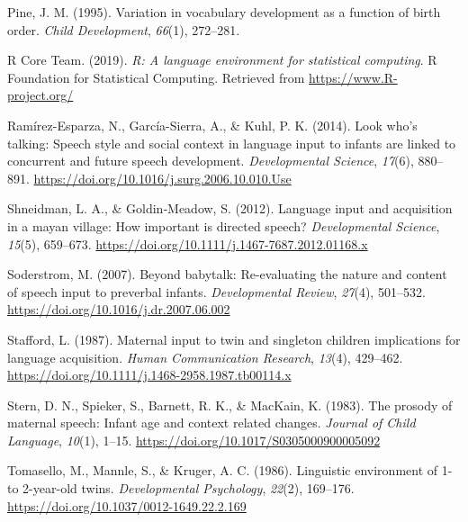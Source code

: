 \documentclass[
  english,
  man,floatsintext]{apa6}
\newlength{\cslhangindent}
\newlength{\cslentryspacingunit} %
\newenvironment{CSLReferences}[2] %
 {%
  \setlength{\parindent}{0pt}
  \ifodd #1
  \let\oldpar\par
  \def\par{\hangindent=\cslhangindent\oldpar}
  \fi
  \setlength{\parskip}{#2\cslentryspacingunit}
 }%
 {}
\begin{document}
\begin{CSLReferences}{1}{0}
\leavevmode{}%
Pine, J. M. (1995). Variation in vocabulary development as a function of birth order. \emph{Child Development}, \emph{66}(1), 272--281.

\leavevmode{}%
R Core Team. (2019). \emph{R: A language environment for statistical computing}. R Foundation for Statistical Computing. Retrieved from \url{https://www.R-project.org/}

\leavevmode{}%
Ramírez-Esparza, N., García-Sierra, A., \& Kuhl, P. K. (2014). Look who's talking: Speech style and social context in language input to infants are linked to concurrent and future speech development. \emph{Developmental Science}, \emph{17}(6), 880--891. \url{https://doi.org/10.1016/j.surg.2006.10.010.Use}

\leavevmode{}%
Shneidman, L. A., \& Goldin‐Meadow, S. (2012). Language input and acquisition in a mayan village: How important is directed speech? \emph{Developmental Science}, \emph{15}(5), 659--673. \url{https://doi.org/10.1111/j.1467-7687.2012.01168.x}

\leavevmode{}%
Soderstrom, M. (2007). Beyond babytalk: Re-evaluating the nature and content of speech input to preverbal infants. \emph{Developmental Review}, \emph{27}(4), 501--532. \url{https://doi.org/10.1016/j.dr.2007.06.002}

\leavevmode{}%
Stafford, L. (1987). Maternal input to twin and singleton children implications for language acquisition. \emph{Human Communication Research}, \emph{13}(4), 429--462. \url{https://doi.org/10.1111/j.1468-2958.1987.tb00114.x}

\leavevmode{}%
Stern, D. N., Spieker, S., Barnett, R. K., \& MacKain, K. (1983). The prosody of maternal speech: Infant age and context related changes. \emph{Journal of Child Language}, \emph{10}(1), 1--15. \url{https://doi.org/10.1017/S0305000900005092}

\leavevmode{}%
Tomasello, M., Mannle, S., \& Kruger, A. C. (1986). Linguistic environment of 1- to 2-year-old twins. \emph{Developmental Psychology}, \emph{22}(2), 169--176. \url{https://doi.org/10.1037/0012-1649.22.2.169}


\end{CSLReferences}
\end{document}
